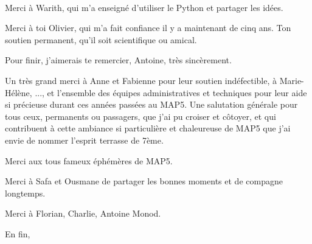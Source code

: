
\\

Merci à Warith, qui m'a enseigné d'utiliser le Python et partager les idées.

Merci à toi Olivier, qui m'a fait confiance il y a maintenant de cinq ans. Ton soutien 
permanent, qu'il soit scientifique ou amical.

Pour finir, j'aimerais te remercier, Antoine, très sincèrement. 

Un très grand merci à Anne et Fabienne pour leur soutien indéfectible, à Marie- Hélène, ...,
 et l'ensemble des équipes administratives et techniques pour leur aide si précieuse durant ces années passées au MAP5. Une salutation générale pour tous ceux, permanents ou passagers, que j'ai pu croiser et côtoyer, et qui contribuent à cette ambiance si particulière et chaleureuse de MAP5 que j'ai envie de nommer l'esprit terrasse de 7ème. 

Merci aux tous fameux éphémères de MAP5. 

Merci à Safa et Ousmane de partager les bonnes moments et de compagne longtemps.

Merci à Florian, Charlie, Antoine Monod. 

En fin, 


